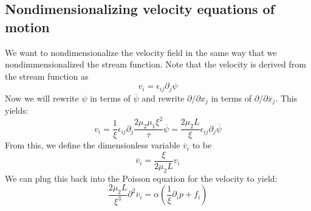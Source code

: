 \documentclass[reqno]{article}
\begin{document}
	\subsection{Nondimensionalizing velocity equations of motion}
	We want to nondimensionalize the velocity field in the same way that we nondimmensionalized the stream function.
	Note that the velocity is derived from the stream function as
	\begin{equation}
		v_i = \epsilon_{ij} \partial_j \psi
	\end{equation}
	Now we will rewrite $\psi$ in terms of $\overline{\psi}$ and rewrite $\partial/\partial x_j$ in terms of $\partial/\partial \overline{x}_j$. 
	This yields:
	\begin{equation}
		v_i 
		= \frac{1}{\xi} \epsilon_{ij} \partial_j \frac{2 \mu_2 \mu_1 \xi^2}{\tau} \overline{\psi}
		= \frac{2 \mu_2 L}{\xi} \epsilon_{ij} \partial_j \overline{\psi}
	\end{equation}
	From this, we define the dimensionless variable $\overline{v}_i$ to be
	\begin{equation}
		\overline{v}_i = \frac{\xi}{2 \mu_2 L} v_i
	\end{equation}
	We can plug this back into the Poisson equation for the velocity to yield:
	\begin{equation}
		\frac{2 \mu_2 L}{\xi^3} \partial^2 \overline{v}_i
		= \alpha \left(
		\frac{1}{\xi} \partial_i p + f_i
		\right)
	\end{equation}
	
\end{document}
